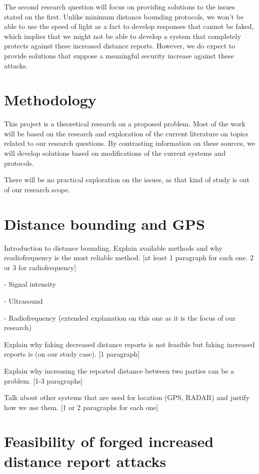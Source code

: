 \documentclass{article}
\begin{document}
The second research question will focus on providing solutions to the issues stated on the first. Unlike minimum distance bounding protocols, we won't be able to use the speed of light as a fact to develop responses that cannot be faked, which implies that we might not be able to develop a system that completely protects against these increased distance reports. However, we do expect to provide solutions that suppose a meaningful security increase against these attacks.

\section{Methodology}

This project is a theoretical research on a proposed problem. Most of the work will be based on the research and exploration of the current literature on topics related to our research questions. By contrasting information on these sources, we will develop solutions based on modifications of the current systems and protocols.

There will be no practical exploration on the issues, as that kind of study is out of our research scope.

\section{Distance bounding and GPS}

Introduction to distance bounding. Explain available methods and why readiofrequency is the most reliable method. [at least 1 paragraph for each one. 2 or 3 for radiofrequency]

- Signal intensity

- Ultrasound

- Radiofrequency (extended explanation on this one as it is the focus of our research)

Explain why faking decreased distance reports is not feasible but faking increased reports is (on our study case). [1 paragraph]

Explain why increasing the reported distance between two parties can be a problem. [1-3 paragraphs]

Talk about other systems that are used for location (GPS, RADAR) and justify how we use them. [1 or 2 paragraphs for each one]

\section{Feasibility of forged increased distance report attacks}
\end{document}
